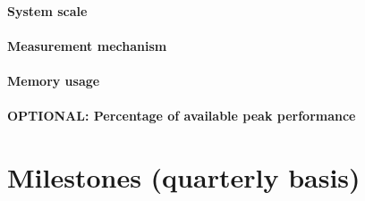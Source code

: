 \documentclass[a4paper,12pt]{article}
\newif\ifshowinstructions
\newcommand{\instructions}[1]{\ifshowinstructions {\fontsize{10}{11}\selectfont #1} \fi}
\begin{document}
\paragraph{System scale}

\instructions{ \it

  One of: results measured on full-scale system, projected from results of smaller system, other (specify).

}

\paragraph{Measurement mechanism}

\instructions{ \it

  One of: timers, FLOP count, static analysis tool, performance modelling, other (specify).

}

\paragraph{Memory usage}

\instructions{ \it

  Specify requirements per node or core depending on the size of the problem.

}

\paragraph{OPTIONAL: Percentage of available peak performance}

\instructions{ \it

  Please collaborate with the Centre on obtaining this information (see also the text referring to Preparatory Access in the Important Notice at the top of Page 1).
  Alternatively provide code specific metrics for the requested machine (FLOPS, etc.).

}

\section{Milestones (quarterly basis) \instructions{(Maximum 1 page)}}
\label{sec:milestones}
\instructions{\it

  Goals and milestones should articulate simulation and developmental objectives and be sufficiently detailed to assess the progress of the project for each year of any allocation granted.
  It is especially important that you provide clear connections between the project's overarching milestones, the planned production simulations, and the compute time expected to be required for these simulations.
  Please clarify any dependencies of milestones on other milestones.
  Please ensure that the node hour consumption is regular throughout the allocation or provide a requested schedule after consultation with the centres.

}
\end{document}
